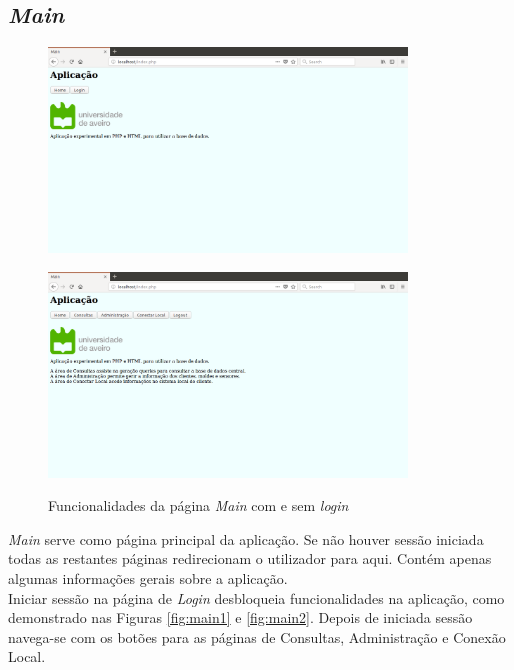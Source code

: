 \documentclass[11pt,twoside,a4paper]{report}
\begin{document}
\subsection{\textit{Main}}
\begin{figure}[H]
\centering
	\begin{minipage}{1.\textwidth}
		\begin{center}
			\includegraphics[width=0.85\textwidth]{main01} %
			\label{fig:main1}
		\end{center}
	\end{minipage}
	\begin{minipage}{1.\textwidth}
		\begin{center}
			\includegraphics[width=0.85\textwidth]{main02} %
			\label{fig:main2}
		\end{center}
	\end{minipage}
	\caption{Funcionalidades da página \textit{Main} com e sem \textit{login}}
	\label{fig:main0}
\end{figure}
\textit{Main} serve como página principal da aplicação. Se não houver sessão iniciada todas as restantes páginas redirecionam o utilizador para aqui. Contém apenas algumas informações gerais sobre a aplicação.\\
Iniciar sessão na página de \textit{Login} desbloqueia funcionalidades na aplicação, como demonstrado nas Figuras \ref{fig:main1} e \ref{fig:main2}. Depois de iniciada sessão navega-se com os botões para as páginas de Consultas, Administração e Conexão Local.
\end{document}
